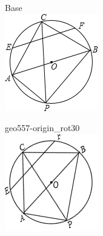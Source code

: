 \documentclass[12pt]{article}
\begin{document}
\begin{center}
\begin{minipage}{0.32\textwidth}\centering
Base\\
\includegraphics[width=0.95\linewidth]{out_rommath_origin/items/geo557-origin/assets/figure.png}
\end{minipage}
\hfill\begin{minipage}{0.32\textwidth}\centering
geo557-origin\_rot30\\
\includegraphics[width=0.95\linewidth]{out_rommath_origin/items/geo557-origin/assets/figure_rot30.png}

\end{minipage}
\end{center}
\end{document}
